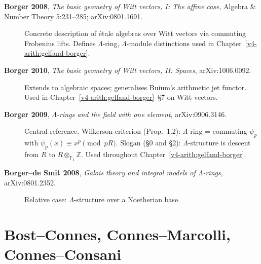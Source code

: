 \begin{description}
\item[\textbf{Borger 2008}, \emph{The basic geometry of Witt
vectors, I: The affine case}, Algebra \& Number Theory 5:231--285;
arXiv:0801.1691.] Concrete description of \'etale algebras over
Witt vectors via commuting Frobenius lifts. Defines \(\Lambda\)-ring,
\(\Lambda\)-module distinctions used in
Chapter~\ref{v4-arith:gelfand-borger}.
\item[\textbf{Borger 2010}, \emph{The basic geometry of Witt
vectors, II: Spaces}, arXiv:1006.0092.] Extends to algebraic spaces;
generalises Buium's arithmetic jet functor. Used in
Chapter~\ref{v4-arith:gelfand-borger}~\S7 on Witt vectors.
\item[\textbf{Borger 2009}, \emph{\(\Lambda\)-rings and the field
with one element}, arXiv:0906.3146.] Central reference. Wilkerson
criterion (Prop.~1.2): \(\Lambda\)-ring = commuting \(\psi_{p}\) with
\(\psi_{p}(x)\equiv x^{p}\pmod{pR}\). Slogan (\S0 and \S2):
\(\Lambda\)-structure is descent from \(R\) to
\(R\otimes_{\mathbb{F}_{1}}\mathbb{Z}\). Used throughout
Chapter~\ref{v4-arith:gelfand-borger}.
\item[\textbf{Borger--de Smit 2008}, \emph{Galois theory and
integral models of \(\Lambda\)-rings}, arXiv:0801.2352.] Relative
case: \(\Lambda\)-structure over a Noetherian base.
\end{description}

\section{Bost--Connes, Connes--Marcolli, Connes--Consani}
\label{v4-arith:app:A:connes-etc}

